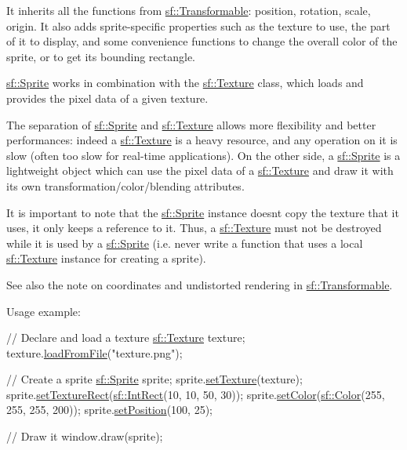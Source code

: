 It inherits all the functions from \hyperlink{classsf_1_1_transformable}{sf\+::\+Transformable}\+: position, rotation, scale, origin. It also adds sprite-\/specific properties such as the texture to use, the part of it to display, and some convenience functions to change the overall color of the sprite, or to get its bounding rectangle.

\hyperlink{classsf_1_1_sprite}{sf\+::\+Sprite} works in combination with the \hyperlink{classsf_1_1_texture}{sf\+::\+Texture} class, which loads and provides the pixel data of a given texture.

The separation of \hyperlink{classsf_1_1_sprite}{sf\+::\+Sprite} and \hyperlink{classsf_1_1_texture}{sf\+::\+Texture} allows more flexibility and better performances\+: indeed a \hyperlink{classsf_1_1_texture}{sf\+::\+Texture} is a heavy resource, and any operation on it is slow (often too slow for real-\/time applications). On the other side, a \hyperlink{classsf_1_1_sprite}{sf\+::\+Sprite} is a lightweight object which can use the pixel data of a \hyperlink{classsf_1_1_texture}{sf\+::\+Texture} and draw it with its own transformation/color/blending attributes.

It is important to note that the \hyperlink{classsf_1_1_sprite}{sf\+::\+Sprite} instance doesn\textquotesingle{}t copy the texture that it uses, it only keeps a reference to it. Thus, a \hyperlink{classsf_1_1_texture}{sf\+::\+Texture} must not be destroyed while it is used by a \hyperlink{classsf_1_1_sprite}{sf\+::\+Sprite} (i.\+e. never write a function that uses a local \hyperlink{classsf_1_1_texture}{sf\+::\+Texture} instance for creating a sprite).

See also the note on coordinates and undistorted rendering in \hyperlink{classsf_1_1_transformable}{sf\+::\+Transformable}.

Usage example\+: 
\begin{DoxyCode}
\textcolor{comment}{// Declare and load a texture}
\hyperlink{classsf_1_1_texture}{sf::Texture} texture;
texture.\hyperlink{classsf_1_1_texture_a8e1b56eabfe33e2e0e1cb03712c7fcc7}{loadFromFile}(\textcolor{stringliteral}{"texture.png"});

\textcolor{comment}{// Create a sprite}
\hyperlink{classsf_1_1_sprite}{sf::Sprite} sprite;
sprite.\hyperlink{classsf_1_1_sprite_a3729c88d88ac38c19317c18e87242560}{setTexture}(texture);
sprite.\hyperlink{classsf_1_1_sprite_a3fefec419a4e6a90c0fd54c793d82ec2}{setTextureRect}(\hyperlink{classsf_1_1_rect}{sf::IntRect}(10, 10, 50, 30));
sprite.\hyperlink{classsf_1_1_sprite_a14def44da6437bfea20c4df5e71aba4c}{setColor}(\hyperlink{classsf_1_1_color}{sf::Color}(255, 255, 255, 200));
sprite.\hyperlink{classsf_1_1_transformable_a4dbfb1a7c80688b0b4c477d706550208}{setPosition}(100, 25);

\textcolor{comment}{// Draw it}
window.draw(sprite);
\end{DoxyCode}


